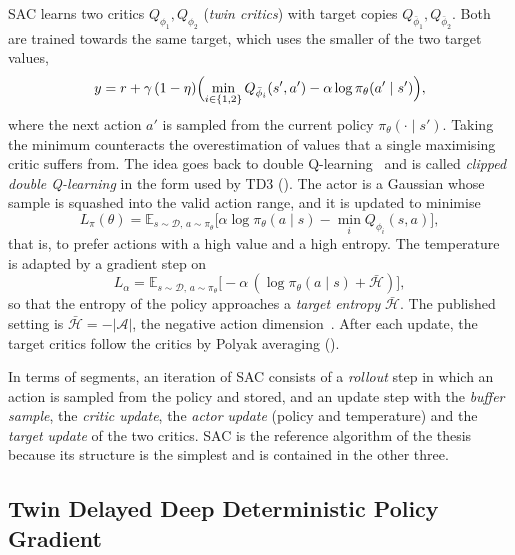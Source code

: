 SAC learns two critics $Q_{\phi_1}, Q_{\phi_2}$ (\emph{twin critics}) with target copies $Q_{\bar{\phi}_1}, Q_{\bar{\phi}_2}$.
Both are trained towards the same target, which uses the smaller of the two target values,
\begin{equation}
  y = r + \gamma\,(1-\eta)\Bigl(\min_{i \in \{1,2\}} Q_{\bar{\phi}_i}(s',a') - \alpha \log \pi_{\theta}(a' \mid s')\Bigr),
  \label{eq:bg-sac-target}
\end{equation}
where the next action $a'$ is sampled from the current policy $\pi_{\theta}(\cdot \mid s')$.
Taking the minimum counteracts the overestimation of values that a single maximising critic suffers from.
The idea goes back to double Q-learning~\cite{vanhasselt2010doubleq} and is called \emph{clipped double Q-learning} in the form used by TD3 ().
The actor is a Gaussian whose sample is squashed into the valid action range, and it is updated to minimise
\begin{equation}
  L_{\pi}(\theta) = \mathbb{E}_{s \sim \mathcal{D},\, a \sim \pi_{\theta}}\bigl[\alpha \log \pi_{\theta}(a \mid s) - \min_{i} Q_{\phi_i}(s,a)\bigr],
  \label{eq:bg-sac-policy}
\end{equation}
that is, to prefer actions with a high value and a high entropy.
The temperature is adapted by a gradient step on
\begin{equation}
  L_{\alpha} = \mathbb{E}_{s \sim \mathcal{D},\, a \sim \pi_{\theta}}\bigl[-\alpha\,(\log \pi_{\theta}(a \mid s) + \bar{\mathcal{H}})\bigr],
  \label{eq:bg-sac-temp}
\end{equation}
so that the entropy of the policy approaches a \emph{target entropy} $\bar{\mathcal{H}}$.
The published setting is $\bar{\mathcal{H}} = -|\mathcal{A}|$, the negative action dimension~\cite{haarnoja2018sacapps}.
After each update, the target critics follow the critics by Polyak averaging ().

In terms of segments, an iteration of SAC consists of a \emph{rollout} step in which an action is sampled from the policy and stored, and an update step with the \emph{buffer sample}, the \emph{critic update}, the \emph{actor update} (policy and temperature) and the \emph{target update} of the two critics.
SAC is the reference algorithm of the thesis because its structure is the simplest and is contained in the other three.

\subsection{Twin Delayed Deep Deterministic Policy Gradient}\label{sec:algo-td3}

